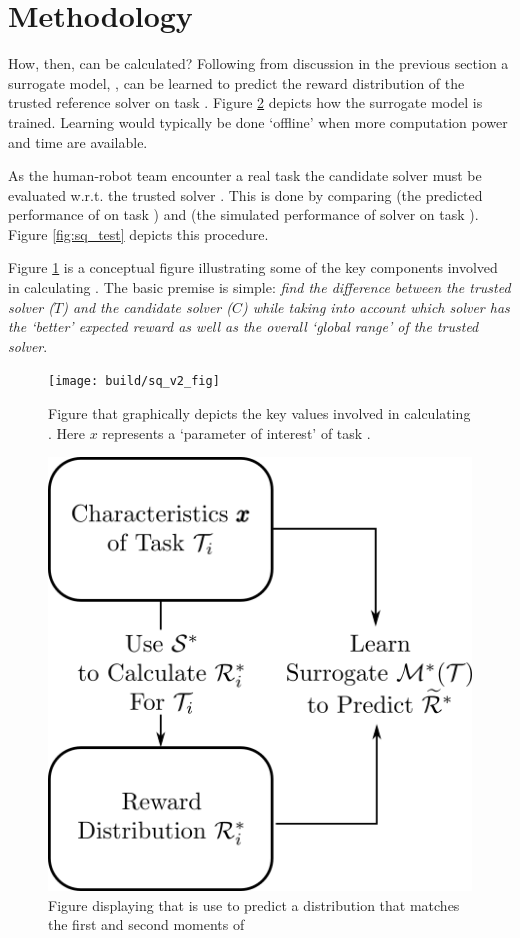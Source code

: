 \section{Methodology}
How, then, can \xQ{} be calculated? Following from discussion in the previous section a surrogate model, \surrogate{}, can be learned to predict the reward distribution \rwdstarapprox{} of the trusted reference solver \solvestar{} on task \task{}. Figure \ref{fig:sq_train} depicts how the surrogate model is trained. Learning \surrogate{} would typically be done `offline' when more computation power and time are available.

As the human-robot team encounter a real task the candidate solver \solve{} must be evaluated w.r.t. the trusted solver \solvestar{}. This is done by comparing \rwdstarapprox{} (the predicted performance of \solvestar{} on task \task) and \rwd{} (the simulated performance of solver \solve{} on task \task). Figure \ref{fig:sq_test} depicts this procedure.

Figure \ref{fig:sq_v2} is a conceptual figure illustrating some of the key components involved in calculating \xQ. The basic premise is simple: \emph{find the difference between the trusted solver ($T$) and the candidate solver ($C$) while taking into account which solver has the `better' expected reward as well as the overall `global range' of the trusted solver}.

\begin{figure}[tb]
    \centering
    \texttt{[image: build/sq\_v2\_fig]}
    \caption{Figure that graphically depicts the key values involved in calculating \xQ. Here $x$ represents a `parameter of interest' of task \task.}
    \label{fig:sq_v2}
\end{figure}

\begin{figure}[tb]
    \centering
    \includegraphics[width=0.55\linewidth]{Figures/SQ_train.png}
    \caption{Figure displaying that \surrogate{} is use to predict a distribution  \rwdstariapprox{} that matches the first and second moments of \rwdstari}
    \label{fig:sq_train}
\end{figure}%

